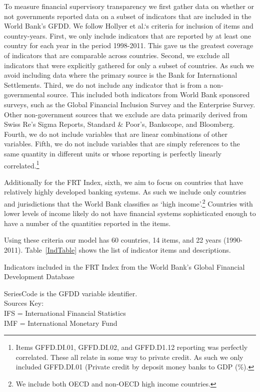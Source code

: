 \documentclass[a4paper]{article}
\begin{document}
To measure financial supervisory transparency we first gather data on whether or not governments reported data on a subset of indicators that are included in the World Bank's GFDD. We follow Hollyer et al.`s \citeyearpar{Hollyer2014} criteria for inclusion of items and country-years. First, we only include indicators that are reported by at least one country for each year in the period 1998-2011. This gave us the greatest coverage of indicators that are comparable across countries. Second, we exclude all indicators that were explicitly gathered for only a subset of countries. As such we avoid including data where the primary source is the Bank for International Settlements. Third, we do not include any indicator that is from a non-governmental source. This included both indicators from World Bank sponsored surveys, such as the Global Financial Inclusion Survey and the Enterprise Survey. Other non-government sources that we exclude are data primarily derived from Swiss Re's Sigma Reports, Standard \& Poor's, Bankscope, and Bloomberg. Fourth, we do not include variables that are linear combinations of other variables. Fifth, we do not include variables that are simply references to the same quantity in different units or whose reporting is perfectly linearly correlated.\footnote{Items GFFD.DI.01, GFFD.DI.02, and GFFD.D1.12 reporting was perfectly correlated. These all relate in some way to private credit. As such we only included GFFD.DI.01 (Private credit by deposit money banks to GDP (\%).}

Additionally for the FRT Index, sixth, we aim to focus on countries that have relatively highly developed banking systems. As such we include only countries and jurisdictions that the World Bank classifies as `high income'.\footnote{We include both OECD and non-OECD high income countries.} Countries with lower levels of income likely do not have financial systems sophisticated enough to have a number of the quantities reported in the items.

Using these criteria our model has 60 countries, 14 items, and 22 years (1990-2011). Table~\ref{IndTable} shows the list of indicator items and descriptions.

\begin{table}[ht]
    \caption{Indicators included in the FRT Index from the World Bank's Global Financial Development Database}
    \label{IndTable}
    \vspace{0.3cm}
    \scalebox{0.95}{
        
    }
    {\scriptsize{SeriesCode is the GFDD variable identifier.\\
    Sources Key:\\
    IFS = International Financial Statistics\\
    IMF = International Monetary Fund}}
\end{table}
\end{document}
